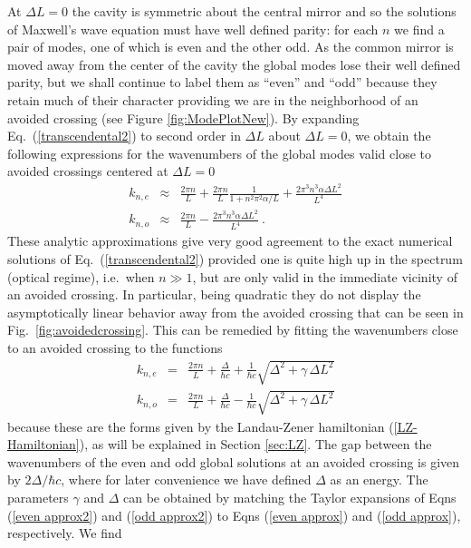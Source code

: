 \documentclass[twocolumn,english,pra,aps,superscriptaddress,floatfix]{revtex4-1}
\begin{document}
At $\Delta L =0$ the cavity is symmetric about the central mirror and so the solutions of Maxwell's wave equation must have well defined parity: for each $n$ we find a pair of modes, one of which is even and the other odd. As the common mirror is moved away from the center of the cavity the global modes lose their well defined parity, but we shall continue to label them as ``even'' and ``odd'' because they retain much of their character providing we are in the neighborhood of an avoided crossing (see Figure \ref{fig:ModePlotNew}).  By expanding Eq.\  (\ref{transcendental2}) to second order in $\Delta L$ about $\Delta{L}=0$, we obtain the following expressions for the wavenumbers of the global modes valid close to avoided crossings centered at $\Delta L=0$
\begin{eqnarray}
k_{n,e} & \approx & \frac{2\pi n}{L}+\frac{2 \pi n}{L}\frac{1}{1+n^{2} \pi^2 \alpha/L}+\frac{2\pi^{3}n^{3}\alpha \Delta L^{2}}{L^4}\label{even approx} \\
k_{n,o} & \approx & \frac{2\pi n}{L}- \frac{2\pi^{3}n^{3}\alpha \Delta L^{2}}{L^4}\label{odd approx} \ .
\end{eqnarray}
These analytic approximations give very good agreement to the exact numerical solutions of Eq.\  (\ref{transcendental2}) provided one is quite high up in the spectrum (optical regime), i.e.\ when $n \gg 1$, but are only valid in the immediate vicinity of an avoided crossing. In particular, being quadratic they do not display the asymptotically linear behavior away from the avoided crossing that can be seen in Fig.\ \ref{fig:avoidedcrossing}. This can be remedied by fitting the wavenumbers close to an avoided crossing to the functions
\begin{eqnarray}
k_{n,e} & = & \frac{2\pi n}{L} + \frac{\Delta}{\hbar c} + \frac{1}{\hbar c} \sqrt{\Delta^2+ \gamma \, \Delta L^2} \label{even approx2} \\
k_{n,o} & = & \frac{2\pi n}{L} + \frac{\Delta}{\hbar c} -  \frac{1}{\hbar c} \sqrt{\Delta^2+ \gamma \, \Delta L^2} \label{odd approx2}
\end{eqnarray} 
because these are the forms given by the Landau-Zener hamiltonian (\ref{LZ-Hamiltonian}), as will be explained in  Section \ref{sec:LZ}. The gap between the wavenumbers of the even and odd global solutions at an avoided crossing is given by $2 \Delta/\hbar c$, where for later convenience we have defined $\Delta$ as an energy.
The parameters $\gamma$ and $\Delta$ can be obtained by matching the Taylor expansions of Eqns (\ref{even approx2}) and (\ref{odd approx2}) to Eqns  (\ref{even approx}) and (\ref{odd approx}), respectively. We find
\end{document}
